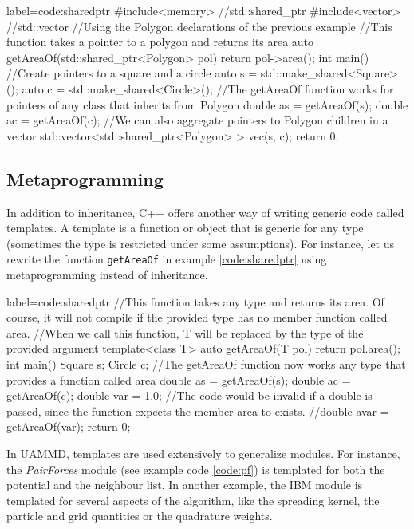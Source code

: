 \documentclass[twoside,openright,titlepage,numbers=noenddot,%
headinclude,footinclude,cleardoublepage=empty,abstract=on,
BCOR=5mm,fontsize=11pt, dvipsnames, paper=b5
]{scrreprt}
\def\ucpp{uammd_cpp_lexer.py:UAMMDCppLexer -x}
\newcommand{\uammd}{\gls{UAMMD}\xspace}
\begin{document}
\begin{code2} {label=code:sharedptr}
  #include<memory> //std::shared_ptr
  #include<vector> //std::vector
  //Using the Polygon declarations of the previous example
  //This function takes a pointer to a polygon and returns its area
  auto getAreaOf(std::shared_ptr<Polygon> pol){
    return pol->area();
  }
  int main(){
    //Create pointers to a square and a circle
    auto s = std::make_shared<Square>();
    auto c = std::make_shared<Circle>();
    //The getAreaOf function works for pointers of any class that inherits from Polygon
    double as = getAreaOf(s);
    double ac = getAreaOf(c);
    //We can also aggregate pointers to Polygon children in a vector
    std::vector<std::shared_ptr<Polygon> > vec({s, c});
    return 0;  
  }
\end{code2}

\subsection*{Metaprogramming}
In addition to inheritance, C++ offers another way of writing generic code called templates. A template is a function or object that is generic for any type (sometimes the type is restricted under some assumptions). For instance, let us rewrite the function \texttt{getAreaOf} in example \ref{code:sharedptr} using metaprogramming instead of inheritance.

\begin{code2} {label=code:sharedptr}
  //This function takes any type and returns its area. Of course, it will not compile if the provided type has no member function called area.
  //When we call this function, T will be replaced by the type of the provided argument
  template<class T>
  auto getAreaOf(T pol){
    return pol.area();
  }
  int main(){
    Square s;
    Circle c;
    //The getAreaOf function now works any type that provides a function called area
    double as = getAreaOf(s);
    double ac = getAreaOf(c);    
    double var = 1.0;
    //The code would be invalid if a double is passed, since the function expects the member area to exists.
    //double avar = getAreaOf(var);
    return 0;  
  }
\end{code2}

In \uammd, templates are used extensively to generalize modules. For instance, the \emph{PairForces} module (see example code \ref{code:pf}) is templated for both the potential and the neighbour list. In another example, the \gls{IBM} module is templated for several aspects of the algorithm, like the spreading kernel, the particle and grid quantities or the quadrature weights.
\end{document}
